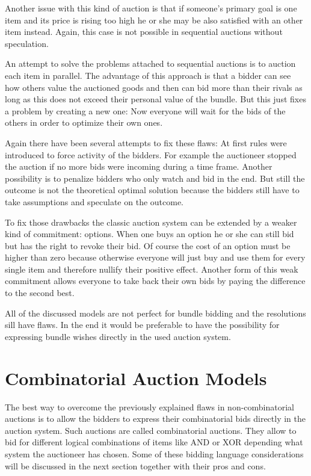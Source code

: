 \documentclass[a4paper]{paper}
\begin{document}
Another issue with this kind of auction is that if someone's primary goal is one item and its price is rising too high he or she may be also satisfied with an other item instead. Again, this case is not possible in sequential auctions without speculation.

An attempt to solve the problems attached to sequential auctions is to auction each item in parallel. The advantage of this approach is that a bidder can see how others value the auctioned goods and then can bid more than their rivals as long as this does not exceed their personal value of the bundle. But this just fixes a problem by creating a new one: Now everyone will wait for the bids of the others in order to optimize their own ones.

Again there have been several attempts to fix these flaws: At first rules were introduced to force activity of the bidders. For example the auctioneer stopped the auction if no more bids were incoming during a time frame. Another possibility is to penalize bidders who only watch and bid in the end. But still the outcome is not the theoretical optimal solution because the bidders still have to take assumptions and speculate on the outcome.

To fix those drawbacks the classic auction system can be extended by a weaker kind of commitment: options. When one buys an option he or she can still bid but has the right to revoke their bid. Of course the cost of an option must be higher than zero because otherwise everyone will just buy and use them for every single item and therefore nullify their positive effect. Another form of this weak commitment allows everyone to take back their own bids by paying the difference to the second best.~\cite[Chapter~1.3]{San02}

All of the discussed models are not perfect for bundle bidding and the resolutions sill have flaws. In the end it would be preferable to have the possibility for expressing bundle wishes directly in the used auction system.

\section{Combinatorial Auction Models}

The best way to overcome the previously explained flaws in non-combinatorial auctions is to allow the bidders to express their combinatorial bids directly in the auction system. Such auctions are called combinatorial auctions. They allow to bid for different logical combinations of items like AND or XOR depending what system the auctioneer has chosen. Some of these bidding language considerations will be discussed in the next section together with their pros and cons.
\end{document}
